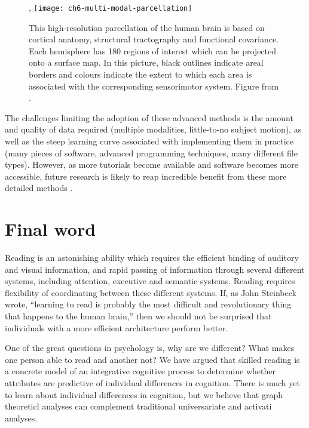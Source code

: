 \begin{figure}[t]
,	\centering
	\texttt{[image: ch6-multi-modal-parcellation]}
	\caption[Multi-modal parcellation of the human brain.]{This high-resolution parcellation of the human brain is based on cortical anatomy, structural tractography and functional covariance. Each hemisphere has 180 regions of interest which can be projected onto a surface map. In this picture, black outlines indicate areal borders and colours indicate the extent to which each area is associated with the corresponding sensorimotor system. Figure from \citep{Glasser2016}.}
	\label{fig:ch6-multi-modal-parcellation}
\end{figure}

The challenges limiting the adoption of these advanced methods is the amount and quality of data required (multiple modalities, little-to-no subject motion), as well as the steep learning curve associated with implementing them in practice (many pieces of software, advanced programming techniques, many different file types). However, as more tutorials become available and software becomes more accessible, future research is likely to reap incredible benefit from these more detailed methods \citep{Poldrack2015}.

\section{Final word}

Reading is an astonishing ability which requires the efficient binding of auditory and visual information, and rapid passing of information through several different systems, including attention, executive and semantic systems.  Reading requires flexibility of coordinating between these different systems. If, as John Steinbeck wrote, ``learning to read is probably the most difficult and revolutionary thing that happens to the human brain,'' then we should not be surprised that individuals with a more efficient architecture perform better. 

One of the great questions in psychology is, why are we different? What makes one person able to read and another not? We have argued that skilled reading is a concrete model of an integrative cognitive process to determine whether attributes are predictive of individual differences in cognition. There is much yet to learn about individual differences in cognition, but we believe that graph theoreticl analyses can complement traditional universariate and activati analyses. 